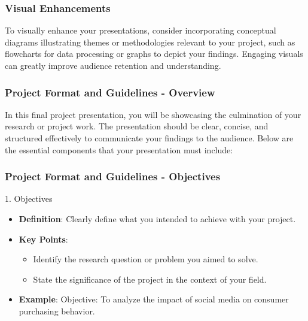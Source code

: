 \documentclass[aspectratio=169]{beamer}
\begin{document}
\begin{frame}[fragile]
    \frametitle{Visual Enhancements}
    To visually enhance your presentations, consider incorporating conceptual diagrams illustrating themes or methodologies relevant to your project, such as flowcharts for data processing or graphs to depict your findings. Engaging visuals can greatly improve audience retention and understanding.
\end{frame}

\begin{frame}[fragile]
    \frametitle{Project Format and Guidelines - Overview}
    In this final project presentation, you will be showcasing the culmination of your research or project work. The presentation should be clear, concise, and structured effectively to communicate your findings to the audience. Below are the essential components that your presentation must include:
\end{frame}

\begin{frame}[fragile]
    \frametitle{Project Format and Guidelines - Objectives}
    \begin{block}{1. Objectives}
        \begin{itemize}
            \item \textbf{Definition}: Clearly define what you intended to achieve with your project.
            \item \textbf{Key Points}:
                \begin{itemize}
                    \item Identify the research question or problem you aimed to solve.
                    \item State the significance of the project in the context of your field.
                \end{itemize}
            \item \textbf{Example}: Objective: To analyze the impact of social media on consumer purchasing behavior.
        \end{itemize}
    \end{block}
\end{frame}
\end{document}

